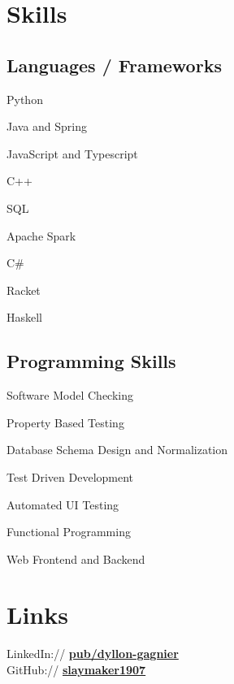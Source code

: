 \documentclass[letterpaper]{deedy-resume} %
\begin{document}
\begin{minipage}[t]{0.35\textwidth}
\sectionspace %


\section{Skills}

\subsection{Languages / Frameworks}
\begin{tightitemize}
\vspace{\topsep} %
\item Python
\item Java and Spring
\item JavaScript and Typescript
\item C++
\item SQL
\item Apache Spark
\item C\#
\item Racket
\item Haskell
\end{tightitemize}

\subsection{Programming Skills}
\begin{tightitemize}
\vspace{\topsep} %
\item Software Model Checking
\item Property Based Testing
\item Database Schema Design and Normalization
\item Test Driven Development
\item Automated UI Testing
\item Functional Programming
\item Web Frontend and Backend
\end{tightitemize}


\section{Links}

LinkedIn:// \href{http://www.linkedin.com/pub/dyllon-gagnier/2a/6b3/808/}{\bf pub/dyllon-gagnier} \\
GitHub:// \href{https://github.com/}{\bf slaymaker1907} \\

\sectionspace %


\end{minipage} %
\end{document}
